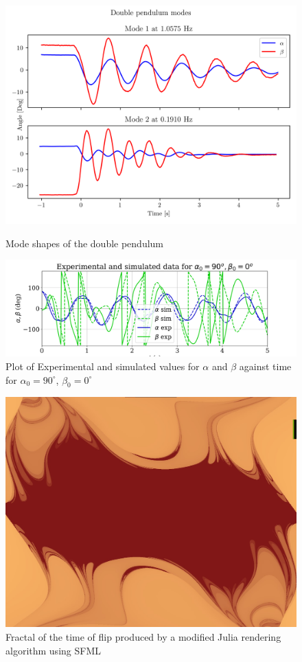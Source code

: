 \documentclass[8pt]{article}
\begin{document}
\begin{figure}[h]
    \centering
    \includegraphics[width=1\textwidth]{modes.png}
    \caption{Mode shapes of the double pendulum}
    \vspace{-1pt}
    \includegraphics[width=1\textwidth]{EP_4_exp_sim.png}
    \caption{Plot of Experimental and simulated values for $\alpha$ and $\beta$ against time for $\alpha_0 = 90^{\circ}$, $\beta_0 = 0^{\circ}$}
\end{figure}

\begin{figure}[h]
    \centering
    \includegraphics[width=1\textwidth]{time_of_flip_render.jpg}
    \caption{Fractal of the time of flip produced by a modified Julia rendering algorithm using SFML}
\end{figure}


\vspace{-2cm}
\end{document}
